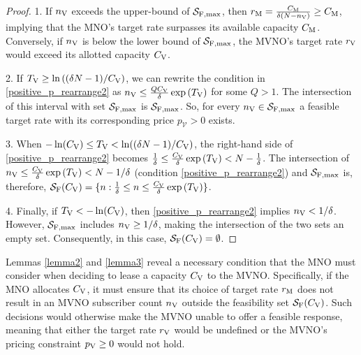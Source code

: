 \documentclass[12pt, draftclsnofoot, onecolumn]{IEEEtran}
\begin{document}
		\begin{proof}		1. If \( n_{\rm V} \) exceeds the upper-bound of \(\mathcal{S}_{\rm F, max}\), then \( r_{\rm M}=\frac{C_{\rm M}}{\delta (N-n_{\rm V})}\geq C_{\rm M} \), implying that the MNO's target rate surpasses its available capacity \( C_{\rm M} \). Conversely, if \( n_{\rm V} \) is below the lower bound of \(\mathcal{S}_{\rm F, max}\), the MVNO’s target rate \( r_{\rm V} \) would exceed its allotted capacity \( C_{\rm V} \).
			
			2. If \( T_{\rm V} \geq \ln\left((\delta N - 1)/C_{\rm V}\right) \), we can rewrite the condition in \eqref{positive_p_rearrange2} as $n_{\rm V} \leq  \frac{Q C_{\rm V}}{\delta}\exp\left(T_{\rm V}\right)$ for some $Q>1$. The intersection of this interval with set \( \mathcal{S}_{\rm F, max}\) is \(\mathcal{S}_{\rm F, max}\). So, for every \(n_{\rm V}\in \mathcal{S}_{\rm F, max}\) a feasible target rate with its corresponding price $p_{\mathcal V}>0$ exists.
			
			3. When \(-\ln(C_{\rm V}) \leq T_{\rm V} < \ln((\delta N - 1)/C_{\rm V})\), the right-hand side of \eqref{positive_p_rearrange2} becomes $\frac{1}{\delta}\leq \frac{C_{\rm V}}{\delta}\exp\left(T_{\rm V}\right)< N-\frac{1}{\delta}$. The intersection of $n_{\rm V}\leq \frac{C_{\rm V}}{\delta}\exp\left(T_{\rm V}\right)< N-1/\delta$ (condition \eqref{positive_p_rearrange2}) and \( \mathcal{S}_{\rm F, max}\) is, therefore, \(\mathcal{S}_{\rm F}(C_{\rm V})=\{ n :   \frac{1}{\delta} \leq n \leq \frac{C_{\rm V}}{\delta}\exp\left(T_{\rm V}\right)   \}\).
			
			
			4. Finally, if \( T_{\rm V} < -\ln(C_{\rm V}) \), then \eqref{positive_p_rearrange2} implies \( n_{\rm V} <    1/\delta  \). However, \(\mathcal{S}_{\rm F, max}\) includes \( n_{\rm V} \geq    1/\delta   \), making the intersection of the two sets an empty set. Consequently, in this case,  \(\mathcal{S}_{\rm F}(C_{\rm V}) = \emptyset\).
		\end{proof}
		Lemmas \ref{lemma2} and \ref{lemma3} reveal a necessary condition that the MNO must consider when deciding to lease a capacity \( C_{\rm V} \) to the MVNO. Specifically, if the MNO allocates \( C_{\rm V} \), it must ensure that its choice of target rate \( r_{\rm M} \) does not result in an MVNO subscriber count \( n_{\rm V} \) outside the feasibility set \( \mathcal{S}_{\rm F}(C_{\rm V}) \). Such decisions would otherwise make the MVNO unable to offer a feasible response, meaning that either the target rate \( r_{\rm V} \) would be undefined or the MVNO’s pricing constraint \( p_{\rm V} \geq 0 \) would not hold.
		
\end{document}
